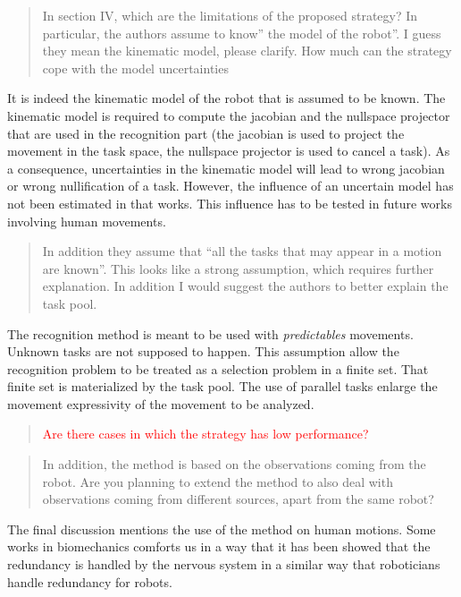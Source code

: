 \documentclass[11pt]{article}
\newcommand{\red}[1]{{\textcolor{red}{#1}}}
\begin{document}
\begin{quote}
  In section IV, which are the limitations of the proposed strategy? In particular, the authors assume to know” the model of the robot”.  I guess they mean the kinematic model, please clarify. How much can the strategy cope with the model uncertainties
\end{quote}
It is indeed the kinematic model of the robot that is assumed to be known. The kinematic model is
required to compute the jacobian and the nullspace projector that are used in the recognition part
(the jacobian is used to project the movement in the task space, the nullspace projector is used
 to cancel a task).
As a consequence, uncertainties in the kinematic model will lead to wrong jacobian or wrong
nullification of a task. However, the influence
of an uncertain model has not been estimated in that works. 
This influence has to be tested in future works involving human movements.

\begin{quote}
 In addition they assume that “all the tasks that may appear in a motion are known”.  This looks like a strong assumption, which requires further explanation.
  In addition I would suggest the authors to better explain the task pool.
\end{quote}
The recognition method is meant to be used with \emph{predictables} movements.
Unknown tasks are not supposed to happen. This assumption allow the 
recognition problem to be treated as a selection problem in a finite
set.
That finite set is materialized by the task pool.
The use of parallel tasks enlarge the movement expressivity of the movement to be analyzed.

\begin{quote}
 \red{Are there cases in which the strategy has low performance?}
 \end{quote}

\begin{quote}
  In addition, the method is based on the observations coming from the robot.  Are you planning to extend the method to also deal with observations coming from different sources, apart from the same robot? 
\end{quote}
The final discussion mentions the use of the method on human motions.
Some works in biomechanics comforts us in a way that it has been showed
that the redundancy is handled by the nervous system in a similar 
way that roboticians handle redundancy for robots.\\
\end{document}
